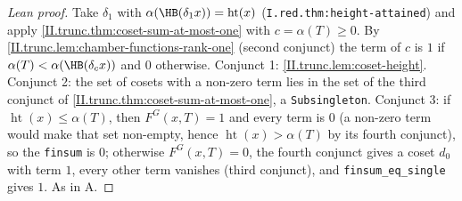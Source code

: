 \begin{proof}[Lean proof]
Take $\delta_1$ with $\alpha(\HB(\delta_1x))=\operatorname{ht}(x)$ (\texttt{I.red.thm:height-attained}) and apply \cref{II.trunc.thm:coset-sum-at-most-one} with $c=\alpha(T)\ge0$. By \cref{II.trunc.lem:chamber-functions-rank-one} (second conjunct) the term of $c$ is $1$ if $\alpha(T)<\alpha(\HB(\delta_cx))$ and $0$ otherwise. Conjunct 1: \cref{II.trunc.lem:coset-height}. Conjunct 2: the set of cosets with a non-zero term lies in the set of the third conjunct of \cref{II.trunc.thm:coset-sum-at-most-one}, a \texttt{Subsingleton}. Conjunct 3: if $\operatorname{ht}(x)\le\alpha(T)$, then $F^G(x,T)=1$ and every term is $0$ (a non-zero term would make that set non-empty, hence $\operatorname{ht}(x)>\alpha(T)$ by its fourth conjunct), so the \texttt{finsum} is $0$; otherwise $F^G(x,T)=0$, the fourth conjunct gives a coset $d_0$ with term $1$, every other term vanishes (third conjunct), and \texttt{finsum\_eq\_single} gives $1$. As in A.
\end{proof}

